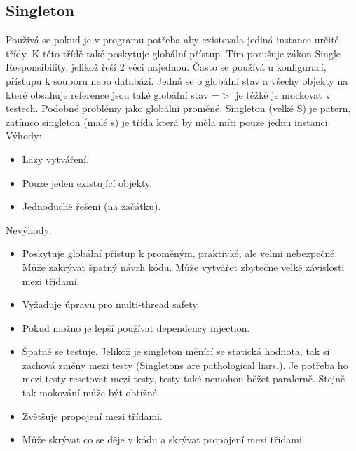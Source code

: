 \documentclass{article}
\begin{document}
\subsection{Singleton} \label{Singleton}
Používá se pokud je v programu potřeba aby existovala jediná instance určité třídy. K této třídě také poskytuje globální přístup. Tím porušuje zákon Single Responsibility, jelikož řeší 2 věci najednou.
Často se používá u konfigurací, přístupu k souboru nebo databázi. Jedná se o globální stav a všechy objekty na které obsahuje reference jsou také globální stav =$>$ je těžké je mockovat v testech. Podobné problémy jako globální proměné. 
Singleton (velké S) je patern, zatímco singleton (malé s) je třída která by měla míti pouze jednu instanci.
\medskip \newline 
%
Výhody:
\begin{itemize}
  \item Lazy vytváření.
  \item Pouze jeden existující objekty.
  \item Jednoduché řešení (na začátku).
\end{itemize}
Nevýhody:
\begin{itemize}
  \item Poskytuje globální přístup k proměným, praktivké, ale velmi nebezpečné.
   Může zakrývat špatný návrh kódu. Může vytvářet zbytečne velké závislosti mezi třídami.
  \item Vyžaduje úpravu pro multi-thread safety.
  \item Pokud možno je lepší používat dependency injection.
  \item Špatně se testuje. Jelikož je singleton měnící se statická hodnota, tak si zachová 
  změny mezi testy (\href{https://testing.googleblog.com/2008/08/by-miko-hevery-so-you-join-new-project.html}{Singletons are pathological liars.}). Je potřeba ho mezi testy resetovat mezi testy, testy také nemohou běžet paralerně. Stejně tak mokování může být obtížné.
  \item Zvětšuje propojení mezi třídami.
  \item Může skrývat co se děje v kódu a skrývat propojení mezi třídami.
\end{itemize}
\medskip
\end{document}
